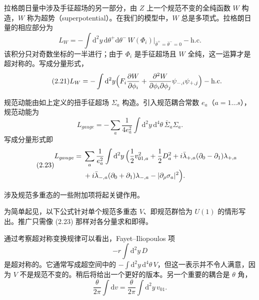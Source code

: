 拉格朗日量中涉及手征超场的另一部分，由 $Z$ 上一个规范不变的全纯函数 $W$ 构造，$W$ 称为超势（superpotential）。在我们的模型中，$W$ 总是多项式。拉格朗日量的相应部分为
\begin{equation}\tag{2.20}
L_W=-\int \mathrm{d}^{2}y\,\mathrm{d}\theta^+\mathrm{d}\theta^-\,W(\Phi_i)\big|_{\bar\theta^+=\bar\theta^-=0}-\mathrm{h.c.}
\end{equation}
该积分只对奇数坐标的一半进行；由于 $\Phi_i$ 是手征超场且 $W$ 全纯，这一运算才是超对称的。写成分量形式，
\begin{equation}\tag{2.21}
L_W=-\int \mathrm{d}^{2}y\Bigl(F_i\frac{\partial W}{\partial\phi_i}+\frac{\partial^2 W}{\partial\phi_i\partial\phi_j}\psi_{-,i}\psi_{+,j}\Bigr)-\mathrm{h.c.}
\end{equation}

规范动能由如上定义的扭手征超场 $\Sigma_a$ 构造。引入规范耦合常数 $e_a$（$a=1\ldots s$），规范动能为
\begin{equation}\tag{2.22}
L_{gauge}=-\sum_a\frac{1}{4e_a^2}\int \mathrm{d}^{2}y\,\mathrm{d}^{4}\theta\,\bar\Sigma_a\Sigma_a.
\end{equation}
写成分量形式即
\begin{equation}\tag{2.23}
\begin{aligned}
L_{gauge}={}&\sum_a\frac{1}{e_a^2}\int \mathrm{d}^{2}y\,\Bigl(\frac{1}{2}v_{01,a}^2+\frac{1}{2}D_a^2+i\bar\lambda_{+,a}(\partial_0-\partial_1)\lambda_{+,a}\\
&+i\bar\lambda_{-,a}(\partial_0+\partial_1)\lambda_{-,a}-|\partial_\rho\sigma_a|^2\Bigr).
\end{aligned}
\end{equation}

涉及规范多重态的一些附加项将起关键作用。

\label{op:12}

为简单起见，以下公式针对单个规范多重态 $V$、即规范群恰为 $U(1)$ 的情形写出。推广只需像 (2.23) 那样对各分量求和即得。

通过考察超对称变换规律可以看出，Fayet--Iliopoulos 项
\begin{equation}\tag{2.24}
-r\int \mathrm{d}^{2}y\,D
\end{equation}
是超对称的。它通常写成超空间中的 $-\int \mathrm{d}^{2}y\,\mathrm{d}^{4}\theta\,V$，但这一表示并不令人满意，因为 $V$ 不是规范不变的。稍后将给出一个更好的版本。另一个重要的耦合是 $\theta$ 角，
\begin{equation}\tag{2.25}
\frac{\theta}{2\pi}\int \mathrm{d}v=\frac{\theta}{2\pi}\int \mathrm{d}^{2}y\,v_{01}.
\end{equation}

